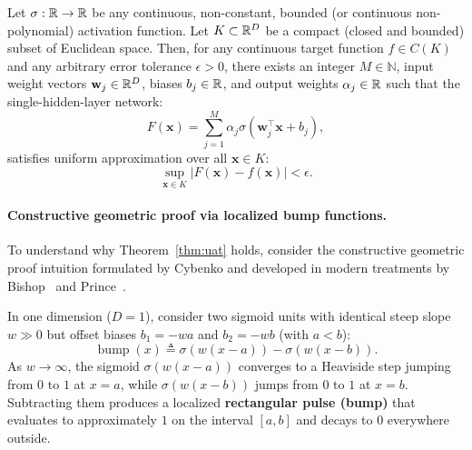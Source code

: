 \begin{theorem}
\label{thm:uat}
Let $\sigma: \mathbb{R} \to \mathbb{R}$ be any continuous, non-constant, bounded (or continuous non-polynomial) activation function. Let $K \subset \mathbb{R}^D$ be a compact (closed and bounded) subset of Euclidean space. Then, for any continuous target function $f \in C(K)$ and any arbitrary error tolerance $\epsilon > 0$, there exists an integer $M \in \mathbb{N}$, input weight vectors $\mathbf{w}_j \in \mathbb{R}^D$, biases $b_j \in \mathbb{R}$, and output weights $\alpha_j \in \mathbb{R}$ such that the single-hidden-layer network:
\begin{equation}
F(\mathbf{x}) = \sum_{j=1}^M \alpha_j \sigma(\mathbf{w}_j^\top \mathbf{x} + b_j),
\label{eq:universal_approximator_form}
\end{equation}
satisfies uniform approximation over all $\mathbf{x} \in K$:
\begin{equation}
\sup_{\mathbf{x} \in K} |F(\mathbf{x}) - f(\mathbf{x})| < \epsilon.
\label{eq:universal_approximation_bound}
\end{equation}
\end{theorem}

\paragraph{Constructive geometric proof via localized bump functions.}
To understand why Theorem~\ref{thm:uat} holds, consider the constructive geometric proof intuition formulated by Cybenko and developed in modern treatments by Bishop~\cite{bishop2024deep} and Prince~\cite{prince2023understanding}.

In one dimension ($D=1$), consider two sigmoid units with identical steep slope $w \gg 0$ but offset biases $b_1 = -w a$ and $b_2 = -w b$ (with $a < b$):
\begin{equation}
\operatorname{bump}(x) \triangleq \sigma(w(x - a)) - \sigma(w(x - b)).
\label{eq:sigmoid_bump}
\end{equation}
As $w \to \infty$, the sigmoid $\sigma(w(x - a))$ converges to a Heaviside step jumping from $0$ to $1$ at $x = a$, while $\sigma(w(x - b))$ jumps from $0$ to $1$ at $x = b$. Subtracting them produces a localized \textbf{rectangular pulse (bump)} that evaluates to approximately $1$ on the interval $[a, b]$ and decays to $0$ everywhere outside.

